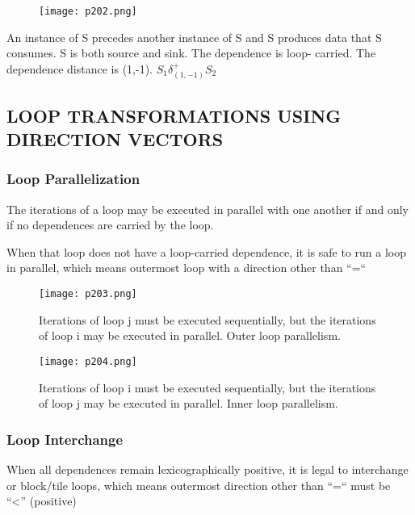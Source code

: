 \begin{figure}[H]
	\centering
	\texttt{[image: p202.png]}
	\caption{}
	\label{fig:p202}
\end{figure}


An instance of S precedes
another instance of S and
S produces data that S
consumes. S is both source and sink. The dependence is loop-
carried.
The dependence distance
is (1,-1). $S_1 \delta^{+}_{(1,-1)} S_2$


\subsection{LOOP TRANSFORMATIONS USING DIRECTION VECTORS}

\subsubsection{Loop Parallelization}

The iterations of a loop may be executed
in parallel with one another if and only if
no dependences are carried by the loop.

When that loop does not have a loop-carried dependence, it 
is safe to run a loop in parallel, which means
 outermost loop with a direction other than “=“

 \begin{figure}[H]
	\centering
	\texttt{[image: p203.png]}
	\caption{Iterations of loop j must be executed sequentially, but the
    iterations of loop i may be executed in parallel. Outer loop parallelism.}
	\label{fig:p203}
\end{figure}


\begin{figure}[H]
	\centering
	\texttt{[image: p204.png]}
	\caption{Iterations of loop i must be executed sequentially, but the
    iterations of loop j may be executed in parallel. Inner loop parallelism.}
	\label{fig:p204}
\end{figure}

\subsubsection{Loop Interchange}

When all dependences remain lexicographically positive,
it is legal to interchange or block/tile loops, which means
outermost direction other than “=“ must be “<” (positive)



